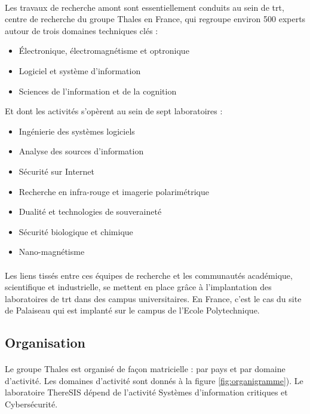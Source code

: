 \paragraph{} Les travaux de recherche amont sont essentiellement conduits au sein de \gls{trt}, centre de recherche du groupe Thales en France, qui regroupe environ 500 experts autour de trois domaines techniques cl\'es :

\begin{itemize}
  \item Électronique, \'electromagn\'etisme et optronique
  \item Logiciel et système d’information
  \item Sciences de l’information et de la cognition
\end{itemize}
  
Et dont les activit\'es s’opèrent au sein de sept laboratoires :

\begin{itemize}
  \item Ing\'enierie des systèmes logiciels
  \item Analyse des sources d’information
  \item S\'ecurit\'e sur Internet
  \item Recherche en infra-rouge et imagerie polarim\'etrique
  \item Dualit\'e et technologies de souverainet\'e
  \item S\'ecurit\'e biologique et chimique
  \item Nano-magn\'etisme
\end{itemize}

\paragraph{} Les liens tiss\'es entre ces \'equipes de recherche et les communaut\'es acad\'emique, scientifique et industrielle, se mettent en place grâce à l’implantation des laboratoires de \gls{trt} dans des campus universitaires. En France, c’est le cas du site de Palaiseau qui est implant\'e sur le campus de l’Ecole Polytechnique.

\subsection{Organisation}

\paragraph{} Le groupe Thales est organis\'e de façon matricielle : par pays et par domaine d’activit\'e. Les domaines d'activit\'e sont donn\'es \`a la figure \ref{fig:organigramme}). Le laboratoire ThereSIS d\'epend de l'activit\'e Systèmes d’information critiques et Cybersécurité.


